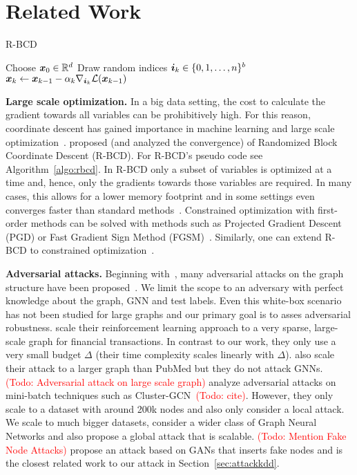 \documentclass[sigconf,authordraft]{acmart}
\newcommand{\todo}[1]{\textcolor{red}{(Todo: #1)}}
\begin{document}
\section{Related Work}\label{sec:related} %

\begin{algorithm}[b]
  \small
  \caption{R-BCD~\citep{Nesterov2012}}
  \label{algo:rbcd}
  \begin{algorithmic}[1]
    \STATE Choose \({\bm{x}}_0 \in \mathbb{R}^d\)
    \STATE Draw random indices \({\bm{i}}_k \in \{0, 1, \dots, n\}^b\)
    \STATE \({\bm{x}}_{k} \leftarrow {\bm{x}}_{k-1} - \alpha_{k} \nabla_{{\bm{i}}_{k}} \mathcal{L}({\bm{x}}_{k-1})\)
    \ENDFOR
  \end{algorithmic}
\end{algorithm}

\textbf{Large scale optimization.} In a big data setting, the cost to calculate the gradient towards all variables can be prohibitively high. For this reason, coordinate descent has gained importance in machine learning and large scale optimization~\citep{Wright2015}. \citet{Nesterov2012} proposed (and analyzed the convergence) of Randomized Block Coordinate Descent (R-BCD). For R-BCD's pseudo code see Algorithm~\ref{algo:rbcd}. In R-BCD only a subset of variables is optimized at a time and, hence, only the gradients towards those variables are required. In many cases, this allows for a lower memory footprint and in some settings even converges faster than standard methods~\citep{Nesterov2017}. Constrained optimization with first-order methods can be solved with methods such as Projected Gradient Descent (PGD) or Fast Gradient Sign Method (FGSM)~\cite{Goodfellow2015}. Similarly, one can extend R-BCD to constrained optimization~\citep{Nesterov2012}.

\textbf{Adversarial attacks.} Beginning with~\citep{Dai2018, Zugner2018}, many adversarial attacks on the graph structure have been proposed~\citep{Zugner2019a, Xu2019a, Bojchevski2019, Wu2019, Wang2019, Tang2020}. We limit the scope to an adversary with perfect knowledge about the graph, GNN and test labels. Even this white-box scenario has not been studied for large graphs and our primary goal is to asses adversarial robustness.
\citet{Dai2018} scale their reinforcement learning approach to a very sparse, large-scale graph for financial transactions. In contrast to our work, they only use a very small budget \(\Delta\) (their time complexity scales linearly with \(\Delta\)). \citet{Wang2019} also scale their attack to a larger graph than PubMed but they do not attack GNNs. \todo{Adversarial attack on large scale graph} analyze adversarial attacks on mini-batch techniques such as Cluster-GCN~\todo{cite}. However, they only scale to a dataset with around 200k nodes and also only consider a local attack. We scale to much bigger datasets, consider a wider class of Graph Neural Networks and also propose a global attack that is scalable. \todo{Mention Fake Node Attacks} propose an attack based on GANs that inserts fake nodes and is the closest related work to our attack in Section~\ref{sec:attackkdd}.
\end{document}
